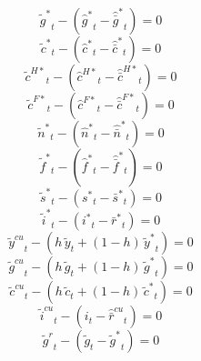 \begin{dmath}
{{\tilde g^*}}_{t}-\left({{\hat g^*}}_{t}-{{\hat {\bar g}^*}}_{t}\right)=0
\end{dmath}
\begin{dmath}
{{\tilde c^*}}_{t}-\left({{\hat c^*}}_{t}-{{\hat {\bar c}^*}}_{t}\right)=0
\end{dmath}
\begin{dmath}
{{\tilde c^{H*}}}_{t}-\left({{\hat c^{H*}}}_{t}-{{\hat {\bar c}^{H*}}}_{t}\right)=0
\end{dmath}
\begin{dmath}
{{\tilde c^{F*}}}_{t}-\left({{\hat c^{F*}}}_{t}-{{\hat {\bar c}^{F*}}}_{t}\right)=0
\end{dmath}
\begin{dmath}
{{\tilde n^*}}_{t}-\left({{\hat n^*}}_{t}-{{\hat {\bar n}^*}}_{t}\right)=0
\end{dmath}
\begin{dmath}
{{\tilde f^*}}_{t}-\left({{\hat f^*}}_{t}-{{\hat {\bar f}^*}}_{t}\right)=0
\end{dmath}
\begin{dmath}
{{\tilde s^*}}_{t}-\left({{s^*}}_{t}-{{\bar s^*}}_{t}\right)=0
\end{dmath}
\begin{dmath}
{{\tilde i^*}}_{t}-\left({{i^*}}_{t}-{{\bar r^*}}_{t}\right)=0
\end{dmath}
\begin{dmath}
{{\tilde y^{cu}}}_{t}-\left({{h}}\, {{\tilde y}}_{t}+\left(1-{{h}}\right)\, {{\tilde y^*}}_{t}\right)=0
\end{dmath}
\begin{dmath}
{{\tilde g^{cu}}}_{t}-\left({{h}}\, {{\tilde g}}_{t}+\left(1-{{h}}\right)\, {{\tilde g^*}}_{t}\right)=0
\end{dmath}
\begin{dmath}
{{\tilde c^{cu}}}_{t}-\left({{h}}\, {{\tilde c}}_{t}+\left(1-{{h}}\right)\, {{\tilde c^*}}_{t}\right)=0
\end{dmath}
\begin{dmath}
{{\tilde i^{cu}}}_{t}-\left({{i}}_{t}-{{\hat {\bar r}^{cu}}}_{t}\right)=0
\end{dmath}
\begin{dmath}
{{\tilde g^{r}}}_{t}-\left({{\tilde g}}_{t}-{{\tilde g^*}}_{t}\right)=0
\end{dmath}
